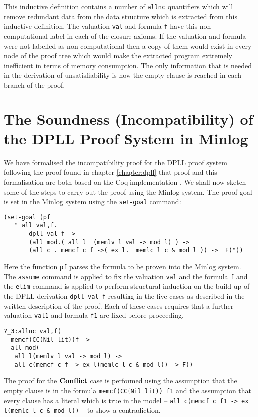 This inductive definition contains a number of \texttt{allnc} quantifiers which will remove redundant data from the data structure which is extracted from this inductive definition. The valuation \texttt{val} and formula \texttt{f} have this non-computational label in each of the closure axioms. If the valuation and formula were not labelled as non-computational then a copy of them would exist in every node of the proof tree which would make the extracted program extremely inefficient in terms of memory consumption. The only information that is needed in the derivation of unsatisfiability is how the empty clause is reached in each branch of the proof.


\section{The Soundness (Incompatibility) of the DPLL Proof System in Minlog}
We have formalised the incompatibility proof for the DPLL proof system following the proof found in chapter \ref{chapter:dpll} that proof and this formalisation are both based on the Coq implementation \cite{SL08}. We shall now sketch some of the steps to carry out the proof using the Minlog system.
The proof goal is set in the Minlog system using the \texttt{set-goal} command:

\begin{lstlisting}
(set-goal (pf 
   " all val,f.
       dpll val f ->  
       (all mod.( all l  (memlv l val -> mod l) ) -> 
       (all c . memcf c f ->( ex l.  memlc l c & mod l )) ->  F)"))
\end{lstlisting}

Here the function \texttt{pf} parses the formula to be proven into the Minlog system. The \texttt{assume} command is applied to fix the valuation \texttt{val} and the formula \texttt{f} and the \texttt{elim} command is applied to perform structural induction on the build up of the DPLL derivation \texttt{dpll val f} resulting in the five cases as described in the written description of the proof. Each of these cases requires that a further valuation \texttt{val1} and formula \texttt{f1} are fixed before proceeding.

\begin{lstlisting}[caption = "The Conflict Case in Minlog"]
?_3:allnc val,f(
  memcf(CC(Nil lit))f ->
  all mod(
   all l(memlv l val -> mod l) ->
   all c(memcf c f -> ex l(memlc l c & mod l)) -> F))
\end{lstlisting}

The proof for the $\mathbf{Conflict}$ case is performed using the assumption that the empty clause is in the formula \texttt{memcf(CC(Nil lit)) f1} and the assumption that every clause has a literal which is true in the model -- \texttt{all c(memcf c f1 -> ex l(memlc l c \& mod l))} -- to show a contradiction. 


